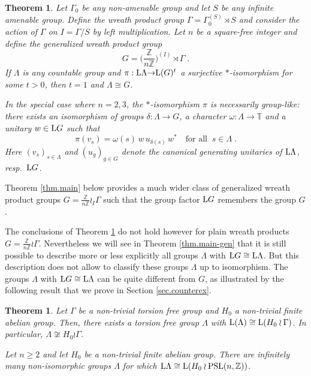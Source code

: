 \documentclass[a4paper,11pt]{amsart}
\numberwithin{equation}{section}
\newtheorem{theorem}[definition]{Theorem}
\begin{document}
\begin{theorem}\label{thm.specialmain}
Let $\Gamma_0$ be any non-amenable group and let $S$ be any infinite amenable group.
Define the wreath product group $\Gamma = \Gamma_0^{(S)} \rtimes S$ and consider
the action of $\Gamma$ on $I = \Gamma/ S$ by left multiplication. Let $n$ be a square-free integer
and define the generalized wreath product group
$$G = \bigl({\textstyle\frac{\mathbb{Z}}{n {\mathbb{Z}}}}\bigr)^{(I)} \rtimes \Gamma \; .$$
If $\Lambda$ is any countable group and $\pi : {\mathord{\text{\rm L}}} \Lambda {\rightarrow} {\mathord{\text{\rm L}}}(G)^t$ a surjective
$*$-isomorphism for some $t > 0$, then $t=1$ and $\Lambda \cong G$.

In the special case where $n = 2,3$, the $*$-isomorphism $\pi$ is necessarily group-like:
there exists an isomorphism of groups $\delta : \Lambda {\rightarrow} G$, a character ${\omega} : \Lambda {\rightarrow} {\mathbb{T}}$
and a unitary $w \in {\mathord{\text{\rm L}}} G$ such that
$$\pi(v_s) = {\omega}(s) \, w \, u_{\delta(s)} \, w^* \quad\text{for all}\;\; s \in \Lambda \; .$$
Here $(v_s)_{s \in \Lambda}$ and $(u_g)_{g \in G}$ denote the canonical generating unitaries
of ${\mathord{\text{\rm L}}} \Lambda$, resp.\ ${\mathord{\text{\rm L}}} G$.
\end{theorem}

Theorem \ref{thm.main} below provides a much wider class of generalized wreath product groups
$G=\frac{\mathbb{Z}}{n{\mathbb{Z}}} \wr_I \Gamma$ such that the group factor ${\mathord{\text{\rm L}}} G$ remembers the group $G$.

The conclusions of Theorem \ref{thm.specialmain} do not hold however
for plain wreath products $G = \frac{\mathbb{Z}}{n{\mathbb{Z}}} \wr \Gamma$.
Nevertheless we will see in Theorem \ref{thm.main-gen} that it is
still possible to describe more or less explicitly all groups
$\Lambda$ with ${\mathord{\text{\rm L}}} G \cong {\mathord{\text{\rm L}}} \Lambda$. But this description does
not allow to classify these groups $\Lambda$ up to isomorphism. The
groups $\Lambda$ with ${\mathord{\text{\rm L}}} G \cong {\mathord{\text{\rm L}}} \Lambda$ can be quite
different from $G$, as illustrated by the following result that we prove in Section \ref{sec.counterex}.

\begin{theorem} \label{thm.counterex}
Let $\Gamma$ be a non-trivial torsion free group and $H_0$ a non-trivial finite abelian group.
Then, there exists a torsion free group $\Lambda$ with ${\mathord{\text{\rm L}}}(\Lambda) \cong {\mathord{\text{\rm L}}} (H_0 \wr \Gamma)$.
In particular, $\Lambda \not\cong H_0 \wr \Gamma$.

Let $n {\geqslant} 2$ and let $H_0$ be a non-trivial finite abelian group. There are infinitely many
non-isomorphic groups $\Lambda$ for which ${\mathord{\text{\rm L}}} \Lambda \cong {\mathord{\text{\rm L}}}(H_0 \wr {\operatorname{PSL}}(n,{\mathbb{Z}}))$.
\end{theorem}
\end{document}
